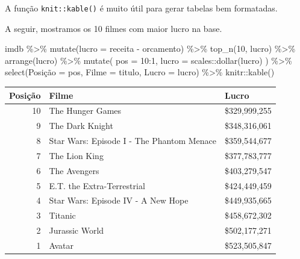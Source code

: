 \documentclass[
]{article}
\newenvironment{Shaded}{\begin{snugshade}}{\end{snugshade}}
\newcommand{\AttributeTok}[1]{\textcolor[rgb]{0.77,0.63,0.00}{#1}}
\newcommand{\DecValTok}[1]{\textcolor[rgb]{0.00,0.00,0.81}{#1}}
\newcommand{\FunctionTok}[1]{\textcolor[rgb]{0.00,0.00,0.00}{#1}}
\newcommand{\NormalTok}[1]{#1}
\newcommand{\OtherTok}[1]{\textcolor[rgb]{0.56,0.35,0.01}{#1}}
\newcommand{\SpecialCharTok}[1]{\textcolor[rgb]{0.00,0.00,0.00}{#1}}
\newcommand{\StringTok}[1]{\textcolor[rgb]{0.31,0.60,0.02}{#1}}
\begin{document}
A função \texttt{knit::kable()} é muito útil para gerar tabelas bem
formatadas.

A seguir, mostramos os 10 filmes com maior lucro na base.

\begin{Shaded}
\begin{Highlighting}[]
\NormalTok{imdb }\SpecialCharTok{\%\textgreater{}\%} 
  \FunctionTok{mutate}\NormalTok{(}\AttributeTok{lucro =}\NormalTok{ receita }\SpecialCharTok{{-}}\NormalTok{ orcamento) }\SpecialCharTok{\%\textgreater{}\%} 
  \FunctionTok{top\_n}\NormalTok{(}\DecValTok{10}\NormalTok{, lucro) }\SpecialCharTok{\%\textgreater{}\%} 
  \FunctionTok{arrange}\NormalTok{(lucro) }\SpecialCharTok{\%\textgreater{}\%}
  \FunctionTok{mutate}\NormalTok{(}
    \AttributeTok{pos =} \DecValTok{10}\SpecialCharTok{:}\DecValTok{1}\NormalTok{,}
    \AttributeTok{lucro =}\NormalTok{ scales}\SpecialCharTok{::}\FunctionTok{dollar}\NormalTok{(lucro)}
\NormalTok{  ) }\SpecialCharTok{\%\textgreater{}\%} 
  \FunctionTok{select}\NormalTok{(}\StringTok{\textasciigrave{}}\AttributeTok{Posição}\StringTok{\textasciigrave{}} \OtherTok{=}\NormalTok{ pos, }\AttributeTok{Filme =}\NormalTok{ titulo, }\AttributeTok{Lucro =}\NormalTok{ lucro) }\SpecialCharTok{\%\textgreater{}\%} 
\NormalTok{  knitr}\SpecialCharTok{::}\FunctionTok{kable}\NormalTok{()}
\end{Highlighting}
\end{Shaded}

\begin{longtable}[]{@{}rll@{}}
\toprule
Posição & Filme & Lucro \\
\midrule
\endhead
10 & The Hunger Games & \$329,999,255 \\
9 & The Dark Knight & \$348,316,061 \\
8 & Star Wars: Episode I - The Phantom Menace & \$359,544,677 \\
7 & The Lion King & \$377,783,777 \\
6 & The Avengers & \$403,279,547 \\
5 & E.T. the Extra-Terrestrial & \$424,449,459 \\
4 & Star Wars: Episode IV - A New Hope & \$449,935,665 \\
3 & Titanic & \$458,672,302 \\
2 & Jurassic World & \$502,177,271 \\
1 & Avatar & \$523,505,847 \\
\bottomrule
\end{longtable}
\end{document}

